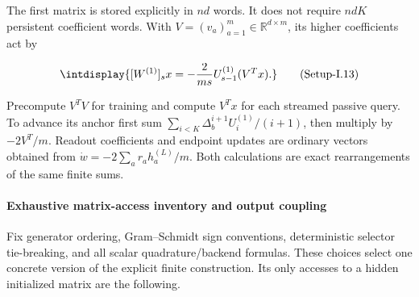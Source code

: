 
The first matrix is stored explicitly in \(nd\) words. It does not require \(ndK\) persistent coefficient words. With \(V=(v_a)_{a=1}^m\in\mathbb R^{d\times m}\), its higher coefficients act by


\label{int:eq-setup-i-13}
\begingroup\renewcommand{\theHequation}{intdisplay.1095}
\begin{equation}
\intdisplay{
[W^{(1)}]_sx=-\frac2{ms}U_{s-1}^{(1)}(V^Tx).
}
\tag{Setup-I.13}
\label{int:eq-0581-setup-i-13}
\end{equation}
\endgroup


Precompute \(V^TV\) for training and compute \(V^Tx\) for each streamed passive query. To advance its anchor first sum \(\sum_{i<K}\Delta_b^{i+1}U_i^{(1)}/(i+1)\), then multiply by \(-2V^T/m\). Readout coefficients and endpoint updates are ordinary vectors obtained from \(\dot w=-2\sum_a r_ah_a^{(L)}/m\). Both calculations are exact rearrangements of the same finite sums.


\paragraph{Exhaustive matrix-access inventory and output coupling}
\label{int:setup-implicit-3}
\mbox{}\par\smallskip


Fix generator ordering, Gram--Schmidt sign conventions, deterministic selector tie-breaking, and all scalar quadrature/backend formulas. These choices select one concrete version of the explicit finite construction. Its only accesses to a hidden initialized matrix are the following.


